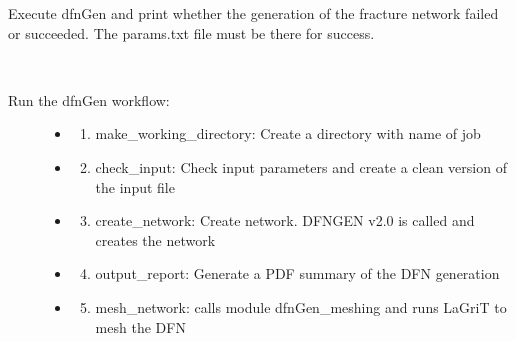 \documentclass[letterpaper,10pt,english]{sphinxmanual}
\begin{document}
\begin{fulllineitems}
\label{pydfnworks:pydfnworks.generator.create_network}
Execute dfnGen and print whether the generation of the fracture network failed or succeeded. The params.txt file must be there for success.

\end{fulllineitems}


\begin{fulllineitems}
\label{pydfnworks:pydfnworks.generator.dfnGen}~\begin{description}
\item[{Run the dfnGen workflow: }] \leavevmode\begin{itemize}
\item {} \begin{enumerate}
\item {} 
make\_working\_directory: Create a directory with name of job

\end{enumerate}

\item {} \begin{enumerate}
\setcounter{enumi}{1}
\item {} 
check\_input: Check input parameters and create a clean version of the input file

\end{enumerate}

\item {} \begin{enumerate}
\setcounter{enumi}{2}
\item {} 
create\_network: Create network. DFNGEN v2.0 is called and creates the network

\end{enumerate}

\item {} \begin{enumerate}
\setcounter{enumi}{3}
\item {} 
output\_report: Generate a PDF summary of the DFN generation

\end{enumerate}

\item {} \begin{enumerate}
\setcounter{enumi}{4}
\item {} 
mesh\_network: calls module dfnGen\_meshing and runs LaGriT to mesh the DFN

\end{enumerate}

\end{itemize}

\end{description}

\end{fulllineitems}
\end{document}
